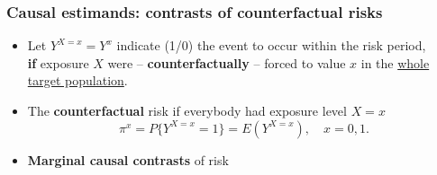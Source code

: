 \documentclass[12pt,dvipsnames,t,aspectratio=169, handout%
]{beamer}
\begin{document}
\begin{frame}
\frametitle{\large Causal estimands: contrasts of counterfactual risks}
\begin{itemize}
\item
Let $Y^{X=x} = Y^x$ %
indicate (1/0) the event to occur within the risk period, \\
\medskip
\textbf{if} exposure $X$ were 
-- \textbf{counterfactually} -- forced
to value $x$ in the \underline{whole target population}. 
\pause
\medskip
\item
The {\bf counterfactual} risk if everybody had exposure level $X=x$
$$  \pi^x = P \{ Y^{X=x} = 1 \} = E(Y^{X=x}), \quad x=0,1. $$ %
\pause
\item
{\bf Marginal causal contrasts} of risk %
\medskip
{}

\end{itemize}  

\end{frame}
\end{document}
